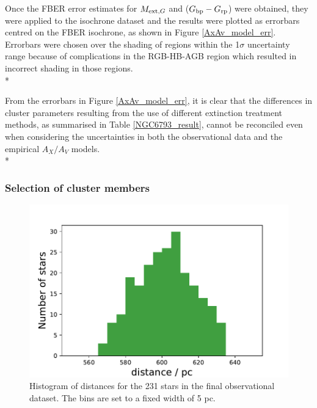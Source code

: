 \documentclass[12pt, a4paper]{report}
\begin{document}
Once the FBER error estimates for $M_{\textnormal{ext},G}$ and ($G_{\textnormal{bp}}-G_{\textnormal{rp}}$) were obtained, they were applied to the isochrone dataset and the results were plotted as errorbars centred on the FBER isochrone, as shown in Figure \ref{AxAv_model_err}. Errorbars were chosen over the shading of regions within the 1$\sigma$ uncertainty range because of complications in the RGB-HB-AGB region which resulted in incorrect shading in those regions.\\*

From the errorbars in Figure \ref{AxAv_model_err}, it is clear that the differences in cluster parameters resulting from the use of different extinction treatment methods, as summarised in Table \ref{NGC6793_result}, cannot be reconciled even when considering the uncertainties in both the observational data and the empirical $A_{X}/A_{V}$ models. \\*

\subsubsection{Selection of cluster members}

\begin{figure}[h!]
\begin{center}
\includegraphics[width=1.0\textwidth]{../NGC_6793_vizier_distances_hist.pdf}
\caption{Histogram of distances for the 231 stars in the final observational dataset. The bins are set to a fixed width of 5 pc.}
\label{NGC_6793_dist_hist}
\end{center}
\end{figure}
\end{document}
